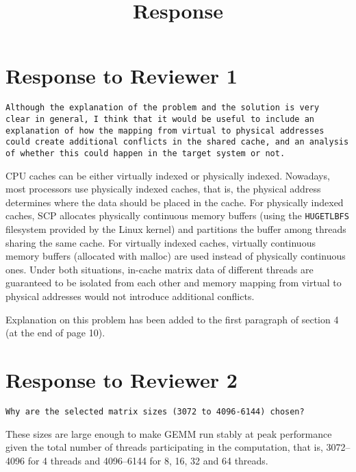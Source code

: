\documentclass[]{article}
\begin{document}
\title{Response}
\date{}
\author{}

\maketitle


\section{Response to Reviewer 1}

\begin{verbatim}
Although the explanation of the problem and the solution is very
clear in general, I think that it would be useful to include an
explanation of how the mapping from virtual to physical addresses
could create additional conflicts in the shared cache, and an analysis
of whether this could happen in the target system or not.
\end{verbatim}

CPU caches can be either virtually indexed or physically indexed.
Nowadays, most processors use physically indexed caches,
that is, the physical address determines where the data should
be placed in the cache.
For physically indexed caches, SCP allocates physically continuous
memory buffers (using the \texttt{HUGETLBFS} filesystem provided
by the Linux kernel)
and partitions the buffer among threads sharing the same cache. 
For virtually indexed caches, virtually continuous
memory buffers (allocated with malloc)
are used instead of physically continuous ones.
Under both situations, in-cache matrix data of different threads
are guaranteed to be isolated from each other
and memory mapping from virtual to physical addresses
would not introduce additional conflicts.

Explanation on this problem has been added to the first paragraph
of section 4 (at the end of page 10).

\section{Response to Reviewer 2}

\begin{verbatim}
Why are the selected matrix sizes (3072 to 4096-6144) chosen?
\end{verbatim}

These sizes are large enough to make GEMM run stably at peak performance
given the total number of threads participating in the computation,
that is, 3072--4096 for 4 threads and 4096--6144 for 8, 16, 32 and 64 threads.
\end{document}
